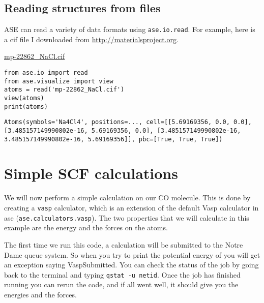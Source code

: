 \documentclass[11pt]{article}
\begin{document}
\subsection{Reading structures from files}
\label{sec:org14ae170}

ASE can read a variety of data formats using \texttt{ase.io.read}. For example, here is a cif file I downloaded from \url{http://materialsproject.org}.

\url{mp-22862\_NaCl.cif}

\begin{verbatim}
from ase.io import read
from ase.visualize import view
atoms = read('mp-22862_NaCl.cif')
view(atoms)
print(atoms)
\end{verbatim}

\begin{verbatim}
Atoms(symbols='Na4Cl4', positions=..., cell=[[5.69169356, 0.0, 0.0], [3.485157149990802e-16, 5.69169356, 0.0], [3.485157149990802e-16, 3.485157149990802e-16, 5.69169356]], pbc=[True, True, True])
\end{verbatim}



\section{Simple SCF calculations}
\label{sec:org46aee55}

We will now perform a simple calculation on our CO molecule. This is done by creating a \texttt{vasp} calculator, which is an extension of the default Vasp calculator in ase (\texttt{ase.calculators.vasp}). The two properties that we will calculate in this example are the energy and the forces on the atoms. 

The first time we run this code, a calculation will be submitted to the Notre Dame queue system. So when you try to print the potential energy of you will get an exception saying VaspSubmitted. You can check the status of the job by going back to the terminal and typing \texttt{qstat -u netid}. Once the job has finished running you can rerun the code, and if all went well, it should give you the energies and the forces.
\end{document}
